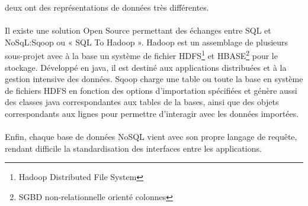 deux ont des représentations de données très différentes.
\\
\\
Il existe une solution \textsf{Open Source} permettant des échanges entre \textsf{SQL} et \textsf{NoSqL}:\textsf{Sqoop} ou « SQL To Hadoop ». \textsf{Hadoop} est un assemblage de plusieurs sous-projet avec à 
la base  un système de fichier \textsf{HDFS}\footnote{Hadoop Distributed File System} et \textsf{HBASE}\footnote{\textsf{SGBD} non-relationnelle orienté colonnes} pour le stockage. Développé en \textsf{java}, il est destiné aux applications distribuées et à la gestion intensive des données. \textsf{Sqoop} charge une table ou toute la base en système de fichiers \textsf{HDFS} en fonction des options d'importation spécifiées et génère aussi des classes \textsf{java} correspondantes aux tables de la bases, ainsi que des objets correspondants aux lignes pour permettre d'interagir avec les données importées.
\\
\\
Enfin, chaque base de données NoSQL vient avec son propre langage de
requête, rendant difficile la standardisation des interfaces entre les
applications\cite{SergeLeblal}.
